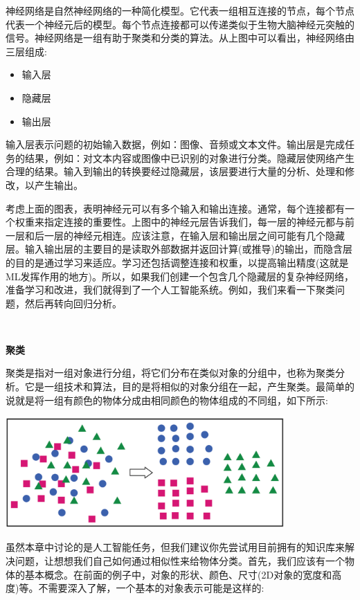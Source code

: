 神经网络是自然神经网络的一种简化模型。它代表一组相互连接的节点，每个节点代表一个神经元后的模型。每个节点连接都可以传递类似于生物大脑神经元突触的信号。神经网络是一组有助于聚类和分类的算法。从上图中可以看出，神经网络由三层组成: \par

\begin{itemize}
	\item 输入层
	\item 隐藏层
	\item 输出层
\end{itemize}

输入层表示问题的初始输入数据，例如：图像、音频或文本文件。输出层是完成任务的结果，例如：对文本内容或图像中已识别的对象进行分类。隐藏层使网络产生合理的结果。输入到输出的转换要经过隐藏层，该层要进行大量的分析、处理和修改，以产生输出。 \par
考虑上面的图表，表明神经元可以有多个输入和输出连接。通常，每个连接都有一个权重来指定连接的重要性。上图中的神经元层告诉我们，每一层的神经元都与前一层和后一层的神经元相连。应该注意，在输入层和输出层之间可能有几个隐藏层。输入输出层的主要目的是读取外部数据并返回计算(或推导)的输出，而隐含层的目的是通过学习来适应。学习还包括调整连接和权重，以提高输出精度(这就是ML发挥作用的地方)。所以，如果我们创建一个包含几个隐藏层的复杂神经网络，准备学习和改进，我们就得到了一个人工智能系统。例如，我们来看一下聚类问题，然后再转向回归分析。 \par

\noindent\textbf{}\ \par
\textbf{聚类} \ \par
聚类是指对一组对象进行分组，将它们分布在类似对象的分组中，也称为聚类分析。它是一组技术和算法，目的是将相似的对象分组在一起，产生聚类。最简单的说就是将一组有颜色的物体分成由相同颜色的物体组成的不同组，如下所示: \par

\begin{center}
	\includegraphics[width=0.8\textwidth]{content/Section-3/Chapter-15/11}
\end{center}

虽然本章中讨论的是人工智能任务，但我们建议你先尝试用目前拥有的知识库来解决问题，让想想我们自己如何通过相似性来给物体分类。首先，我们应该有一个物体的基本概念。在前面的例子中，对象的形状、颜色、尺寸(2D对象的宽度和高度)等。不需要深入了解，一个基本的对象表示可能是这样的: \par

